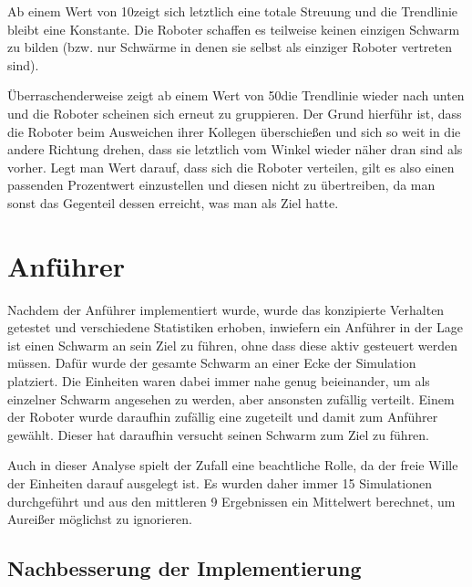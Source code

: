 Ab einem Wert von 10\per zeigt sich letztlich eine totale Streuung und die Trendlinie bleibt eine Konstante. Die Roboter schaffen es teilweise keinen einzigen Schwarm zu bilden (bzw. nur Schwärme in denen sie selbst als einziger Roboter vertreten sind).

Überraschenderweise zeigt ab einem Wert von 50\per die Trendlinie wieder nach unten und die Roboter scheinen sich erneut zu gruppieren. Der Grund hierführ ist, dass die Roboter beim Ausweichen ihrer Kollegen überschießen und sich so weit in die andere Richtung drehen, dass sie letztlich vom Winkel wieder näher dran sind als vorher. Legt man Wert darauf, dass sich die Roboter verteilen, gilt es also einen passenden Prozentwert einzustellen und diesen nicht zu übertreiben, da man sonst das Gegenteil dessen erreicht, was man als Ziel hatte.







\section{Anführer}

\newcommand{\sectionLeaderPictureStats}{width=7.5cm, height=4cm}

Nachdem der Anführer implementiert wurde, wurde das konzipierte Verhalten getestet und verschiedene Statistiken erhoben, inwiefern ein Anführer in der Lage ist einen Schwarm an sein Ziel zu führen, ohne dass diese aktiv gesteuert werden müssen.
Dafür wurde der gesamte Schwarm an einer Ecke der Simulation platziert. Die Einheiten waren dabei immer nahe genug beieinander, um als einzelner Schwarm angesehen zu werden, aber ansonsten zufällig verteilt. Einem der Roboter wurde daraufhin zufällig eine  zugeteilt und damit zum Anführer gewählt. Dieser hat daraufhin versucht seinen Schwarm zum Ziel zu führen.

Auch in dieser Analyse spielt der Zufall eine beachtliche Rolle, da der freie Wille der Einheiten darauf ausgelegt ist. Es wurden daher immer 15 Simulationen durchgeführt und aus den mittleren 9 Ergebnissen ein Mittelwert berechnet, um Aureißer möglichst zu ignorieren.

\subsection*{Nachbesserung der Implementierung}\label{subsec:AnalyseNachbesserung}

